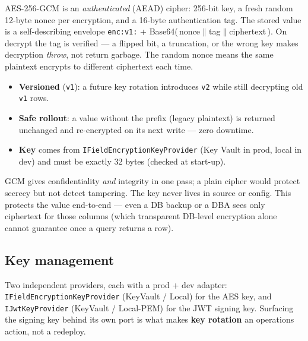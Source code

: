 \documentclass[11pt,a4paper]{article}
\newcommand{\code}[1]{\texttt{\textcolor{spInk}{#1}}}
\begin{document}
\begin{howbox}
AES-256-GCM is an \emph{authenticated} (AEAD) cipher: 256-bit key, a fresh random
12-byte nonce per encryption, and a 16-byte authentication tag. The stored value
is a self-describing envelope
\code{enc:v1:} + Base64(\,nonce $\Vert$ tag $\Vert$ ciphertext\,).
On decrypt the tag is verified --- a flipped bit, a truncation, or the wrong key
makes decryption \emph{throw}, not return garbage. The random nonce means the same
plaintext encrypts to different ciphertext each time.
\end{howbox}

\begin{itemize}
\item \textbf{Versioned} (\code{v1}): a future key rotation introduces \code{v2}
  while still decrypting old \code{v1} rows.
\item \textbf{Safe rollout}: a value without the prefix (legacy plaintext) is
  returned unchanged and re-encrypted on its next write --- zero downtime.
\item \textbf{Key} comes from \code{IFieldEncryptionKeyProvider} (Key Vault in prod,
  local in dev) and must be exactly 32 bytes (checked at start-up).
\end{itemize}

\begin{secbox}
GCM gives confidentiality \emph{and} integrity in one pass; a plain cipher would
protect secrecy but not detect tampering. The key never lives in source or config.
This protects the value end-to-end --- even a DB backup or a DBA sees only
ciphertext for those columns (which transparent DB-level encryption alone cannot
guarantee once a query returns a row).
\end{secbox}

\subsection{Key management}
Two independent providers, each with a prod + dev adapter:
\code{IFieldEncryptionKeyProvider} (KeyVault / Local) for the AES key, and
\code{IJwtKeyProvider} (KeyVault / Local-PEM) for the JWT signing key. Surfacing
the signing key behind its own port is what makes \textbf{key rotation} an
operations action, not a redeploy.

\end{document}
